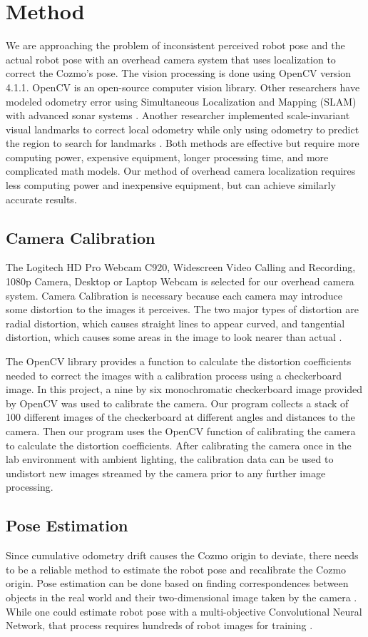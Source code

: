 \documentclass[jou,apacite]{apa6}
\begin{document}
\section{Method}
We are approaching the problem of inconsistent perceived robot pose and the actual robot pose with an overhead camera system that uses localization to correct the Cozmo's pose. The vision processing is done using OpenCV version 4.1.1. OpenCV is an open-source computer vision library. Other researchers have modeled odometry error using Simultaneous Localization and Mapping (SLAM) with advanced sonar systems \cite{Kleeman}. Another researcher implemented scale-invariant visual landmarks to correct local odometry while only using odometry to predict the region to search for landmarks \cite{se}. Both methods are effective but require more computing power, expensive equipment, longer processing time, and more complicated math models. Our method of overhead camera localization requires less computing power and inexpensive equipment, but can achieve similarly accurate results.

\subsection{Camera Calibration}
The Logitech HD Pro Webcam C920, Widescreen Video Calling and Recording, 1080p Camera, Desktop or Laptop Webcam is selected for our overhead camera system. Camera Calibration is necessary because each camera may introduce some distortion to the images it perceives. The two major types of distortion are radial distortion, which causes straight lines to appear curved, and tangential distortion, which causes some areas in the image to look nearer than actual \cite{OpenCV}. 

The OpenCV library provides a function to calculate the distortion coefficients needed to correct the images with a calibration process using a checkerboard image. In this project, a nine by six monochromatic checkerboard image provided by OpenCV was used to calibrate the camera. Our program collects a stack of 100 different images of the checkerboard at different angles and distances to the camera. Then our program uses the OpenCV function of calibrating the camera to calculate the distortion coefficients. 
After calibrating the camera once in the lab environment with ambient lighting, the calibration data can be used to undistort new images streamed by the camera prior to any further image processing.

\subsection{Pose Estimation}
Since cumulative odometry drift causes the Cozmo origin to deviate, there needs to be a reliable method to estimate the robot pose and recalibrate the Cozmo origin. Pose estimation can be done based on finding correspondences between objects in the real world and their two-dimensional image taken by the camera \cite{OpenCV}. While one could estimate robot pose with a multi-objective Convolutional Neural Network, that process requires hundreds of robot images for training \cite{Miseikis}.
\end{document}
